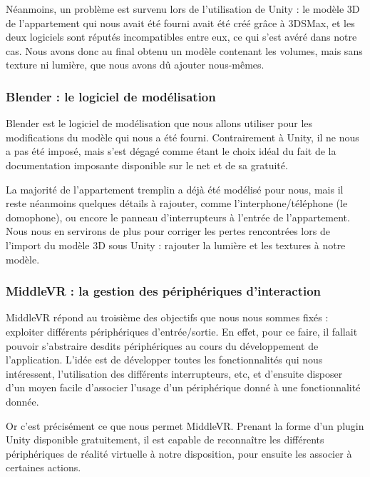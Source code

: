 Néanmoins, un problème est survenu lors de l'utilisation de Unity : le modèle 3D de l'appartement qui nous avait été fourni avait été créé grâce à 3DSMax, et les deux logiciels sont réputés incompatibles entre eux, ce qui s'est avéré dans notre cas. Nous avons donc au final obtenu un modèle contenant les volumes, mais sans texture ni lumière, que nous avons dû ajouter nous-mêmes. 

\subsubsection{Blender : le logiciel de modélisation}
Blender est le logiciel de modélisation que nous allons utiliser pour les modifications du modèle qui nous a été fourni. Contrairement à Unity, il ne nous a pas été imposé, mais s'est dégagé comme étant le choix idéal du fait de la documentation imposante disponible sur le net et de sa gratuité.\newline

La majorité de l'appartement tremplin a déjà été modélisé pour nous, mais il reste néanmoins quelques détails à rajouter, comme l'interphone/téléphone (le domophone), ou encore le panneau d'interrupteurs à l'entrée de l'appartement. Nous nous en servirons de plus pour corriger les pertes rencontrées lors de l'import du modèle 3D sous Unity : rajouter la lumière et les textures à notre modèle. 

\subsubsection{MiddleVR : la gestion des périphériques d'interaction}

MiddleVR répond au troisième des objectifs que nous nous sommes fixés : exploiter différents périphériques d'entrée/sortie. En effet, pour ce faire, il fallait pouvoir s'abstraire desdits périphériques au cours du développement de l'application. L'idée est de développer toutes les fonctionnalités qui nous intéressent, l'utilisation des différents interrupteurs, etc, et d'ensuite disposer d'un moyen facile d'associer l'usage d'un périphérique donné à une fonctionnalité donnée.\newline

Or c'est précisément ce que nous permet MiddleVR. Prenant la forme d'un plugin Unity disponible gratuitement, il est capable de reconnaître les différents périphériques de réalité virtuelle à notre disposition, pour ensuite les associer à certaines actions.

